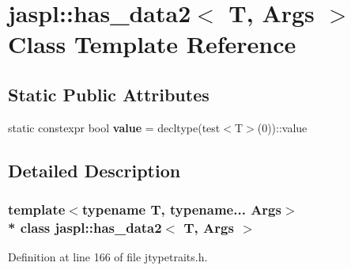 \hypertarget{classjaspl_1_1has__data2}{}\section{jaspl\+:\+:has\+\_\+data2$<$ T, Args $>$ Class Template Reference}
\label{classjaspl_1_1has__data2}
\subsection*{Static Public Attributes}
\begin{DoxyCompactItemize}
\item 
static constexpr bool {\bfseries value} = decltype(test$<$T$>$(0))\+::value\hypertarget{classjaspl_1_1has__data2_a5fb339475f461c83cfbc47585c1c62dc}{}\label{classjaspl_1_1has__data2_a5fb339475f461c83cfbc47585c1c62dc}

\end{DoxyCompactItemize}


\subsection{Detailed Description}
\subsubsection*{template$<$typename T, typename... Args$>$\\*
class jaspl\+::has\+\_\+data2$<$ T, Args $>$}



Definition at line 166 of file jtypetraits.\+h.

